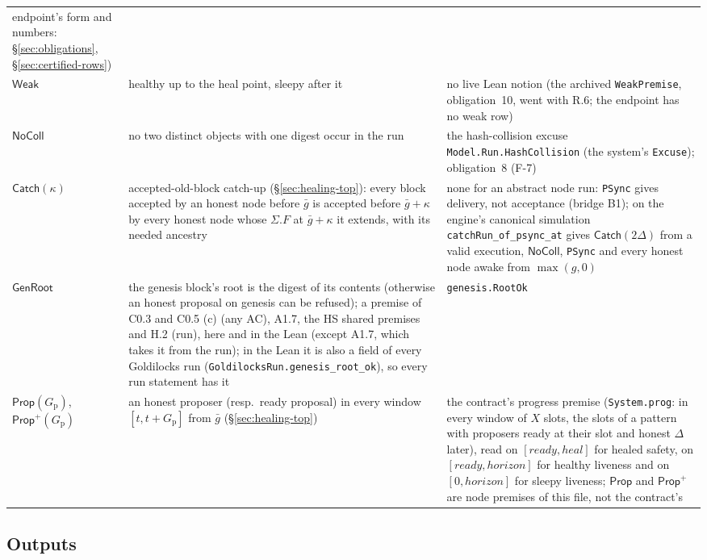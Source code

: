 \documentclass{article}
\begin{document}
\begin{longtable}{@{}>{\raggedright\arraybackslash}p{2.2cm}>{\raggedright\arraybackslash}p{6.4cm}>{\raggedright\arraybackslash}p{4.6cm}@{}}
  endpoint's form and numbers: \S\ref{sec:obligations},
  \S\ref{sec:certified-rows})\\
$\mathsf{Weak}$ & healthy up to the heal point, sleepy after it &
  no live Lean notion (the archived \texttt{WeakPremise}, obligation~10,
  went with R.6; the endpoint has no weak row)\\
$\mathsf{NoColl}$ & no two distinct objects with one digest occur in the run &
  the hash-collision excuse \texttt{Model.Run.HashCollision} (the
  system's \texttt{Excuse}); obligation~8 (F-7)\\
$\mathsf{Catch}(\kappa)$ & accepted-old-block catch-up
  (\S\ref{sec:healing-top}): every block accepted by an honest node before
  $\bar g$ is accepted before $\bar g+\kappa$ by every honest node whose
  $\Sigma.F$ at $\bar g+\kappa$ it extends, with its needed ancestry & none
  for an abstract node run:
  \texttt{PSync} gives delivery, not acceptance (bridge B1); on the engine's
  canonical simulation \texttt{catchRun\_of\_psync\_at} gives
  $\mathsf{Catch}(2\Delta)$ from a valid execution, $\mathsf{NoColl}$,
  \texttt{PSync} and every honest node awake from $\max(g,0)$\\
$\mathsf{GenRoot}$ & the genesis block's root is the digest of its contents
  (otherwise an honest proposal on genesis can be refused); a premise of
  C0.3 and C0.5 (c) (any AC), A1.7, the HS shared premises and H.2 (run),
  here and in the Lean (except A1.7, which takes it from the run); in the
  Lean it is also a field of every Goldilocks
  run (\texttt{GoldilocksRun.genesis\_root\_ok}), so every run statement has
  it &
  \texttt{genesis.RootOk}\\
$\mathsf{Prop}(G_{\mathrm p})$, $\mathsf{Prop}^{+}(G_{\mathrm p})$ & an honest
  proposer (resp.\ ready proposal) in every window $[t,t+G_{\mathrm p}]$ from
  $\bar g$ (\S\ref{sec:healing-top}) & the contract's progress premise
  (\texttt{System.prog}: in every window of $X$ slots, the slots of a
  pattern with proposers ready at their slot and honest $\Delta$ later), read
  on $[\mathit{ready},\mathit{heal}]$ for healed safety, on
  $[\mathit{ready},\mathit{horizon}]$ for healthy liveness and on
  $[0,\mathit{horizon}]$ for sleepy liveness; $\mathsf{Prop}$ and $\mathsf{Prop}^{+}$ are node premises of
  this file, not the contract's\\
\hline
\end{longtable}

\subsection{Outputs}
\end{document}
